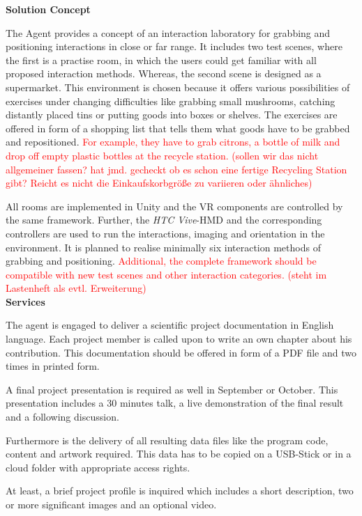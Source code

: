 \documentclass[a4paper, 12pt]{article}
\begin{document}
\textbf{Solution Concept}
 
 The Agent provides a concept of an interaction laboratory for grabbing and positioning interactions in close or far range. It includes two test scenes, where the first is a practise room, in which the users could get familiar with all proposed interaction methods. Whereas, the second scene is designed as a supermarket. This environment is chosen because it offers various possibilities of exercises under changing difficulties like grabbing small mushrooms, catching distantly placed tins or putting goods into boxes or shelves. The exercises are offered in form of a shopping list that tells them what goods have to be grabbed and repositioned. \textcolor{red}{For example, they have to grab citrons, a bottle of milk and drop off empty plastic bottles at the recycle station. (sollen wir das nicht allgemeiner fassen? hat jmd. gecheckt ob es schon eine fertige Recycling Station gibt? Reicht es nicht die Einkaufskorbgröße zu variieren oder ähnliches) } 
 
 All rooms are implemented in Unity and the VR components are controlled by the same framework. Further, the \textit{HTC Vive}-HMD and the corresponding controllers are used to run the interactions, imaging and orientation in the environment. It is planned to realise minimally six interaction methods of grabbing and positioning. \textcolor{red}{Additional, the complete framework should be compatible with new test scenes and other interaction categories. (steht im Lastenheft als evtl. Erweiterung)} \\

 
\textbf{Services}

The agent is engaged to deliver a scientific project documentation in English language. Each project member is called upon to write an own chapter about his contribution. This documentation should be offered in form of a PDF file and two times in printed form. 

A final project presentation is required as well in September or October. This presentation includes a 30 minutes talk, a live demonstration of the final result and a following discussion.

Furthermore is the delivery of all resulting data files like the program code, content and artwork required. This data has to be copied on a USB-Stick or in a cloud folder with appropriate access rights.

At least, a brief project profile is inquired which includes a short description, two or more significant images and an optional video.\\
\end{document}
